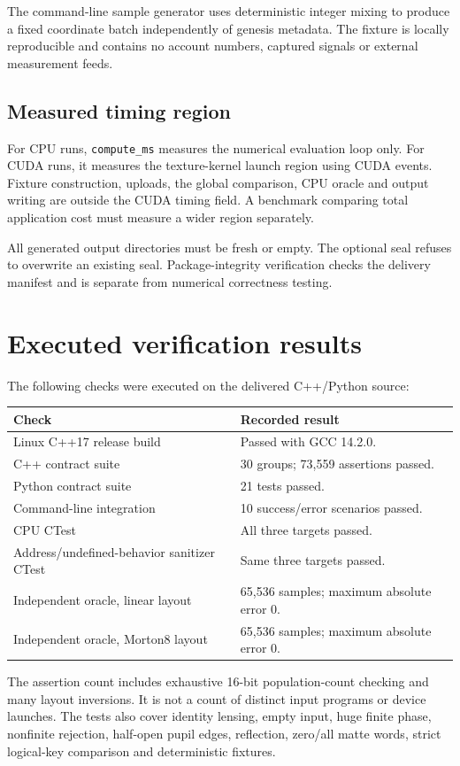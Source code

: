 \documentclass[11pt,a4paper]{article}
\newcommand{\code}[1]{\texttt{#1}}
\begin{document}
The command-line sample generator uses deterministic integer mixing to produce a fixed coordinate batch independently of genesis metadata. The fixture is locally reproducible and contains no account numbers, captured signals or external measurement feeds.

\subsection{Measured timing region}
For CPU runs, \code{compute\_ms} measures the numerical evaluation loop only. For CUDA runs, it measures the texture-kernel launch region using CUDA events. Fixture construction, uploads, the global comparison, CPU oracle and output writing are outside the CUDA timing field. A benchmark comparing total application cost must measure a wider region separately.

All generated output directories must be fresh or empty. The optional seal refuses to overwrite an existing seal. Package-integrity verification checks the delivery manifest and is separate from numerical correctness testing.
\clearpage

\section{Executed verification results}
The following checks were executed on the delivered C++/Python source:
\begin{center}
\begin{tabularx}{\textwidth}{@{}P{.47\textwidth}Y@{}}\toprule
\textbf{Check} & \textbf{Recorded result}\\\midrule
Linux C++17 release build & Passed with GCC 14.2.0.\\
C++ contract suite & 30 groups; 73,559 assertions passed.\\
Python contract suite & 21 tests passed.\\
Command-line integration & 10 success/error scenarios passed.\\
CPU CTest & All three targets passed.\\
Address/undefined-behavior sanitizer CTest & Same three targets passed.\\
Independent oracle, linear layout & 65,536 samples; maximum absolute error 0.\\
Independent oracle, Morton8 layout & 65,536 samples; maximum absolute error 0.\\\bottomrule
\end{tabularx}
\end{center}
The assertion count includes exhaustive 16-bit population-count checking and many layout inversions. It is not a count of distinct input programs or device launches. The tests also cover identity lensing, empty input, huge finite phase, nonfinite rejection, half-open pupil edges, reflection, zero/all matte words, strict logical-key comparison and deterministic fixtures.
\end{document}
